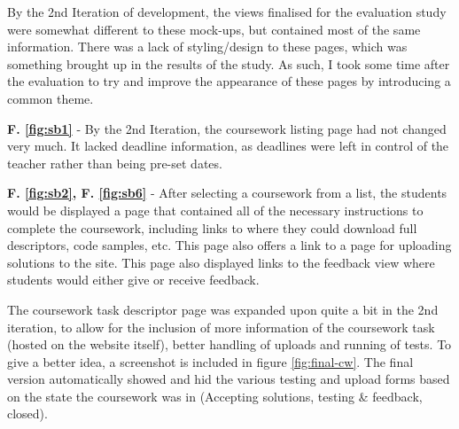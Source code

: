 \documentclass[a4paper,11pt]{report}
\begin{document}
By the 2nd Iteration of development, the views finalised for the evaluation study were somewhat different to these mock-ups, but contained most of the same information. There was a lack of styling/design to these pages, which was something brought up in the results of the study. As such, I took some time after the evaluation to try and improve the appearance of these pages by introducing a common theme.\par
\textbf{F. \ref{fig:sb1}} - By the 2nd Iteration, the coursework listing page had not changed very much. It lacked deadline information, as deadlines were left in control of the teacher rather than being pre-set dates.\par
\textbf{F. \ref{fig:sb2}, F. \ref{fig:sb6}} - After selecting a coursework from a list, the students would be displayed a page that contained all of the necessary instructions to complete the coursework, including links to where they could download full descriptors, code samples, etc. This page also offers a link to a page for uploading solutions to the site. This page also displayed links to the feedback view where students would either give or receive feedback.\par
The coursework task descriptor page was expanded upon quite a bit in the 2nd iteration, to allow for the inclusion of more information of the coursework task (hosted on the website itself), better handling of uploads and running of tests. To give a better idea, a screenshot is included in figure \ref{fig:final-cw}. The final version automatically showed and hid the various testing and upload forms based on the state the coursework was in (Accepting solutions, testing \& feedback, closed).\par
\end{document}
